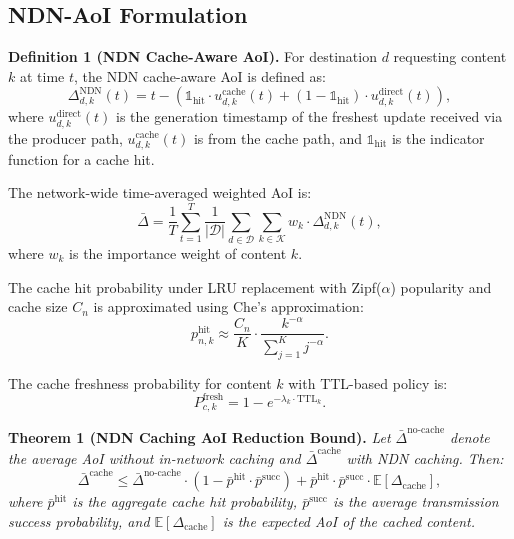 \documentclass[journal]{IEEEtran}
\begin{document}
\subsection{NDN-AoI Formulation} \label{subsec:ndn_aoi}

\textbf{Definition 1 (NDN Cache-Aware AoI).} For destination $d$ requesting content $k$ at time $t$, the NDN cache-aware AoI is defined as:
\begin{equation} \label{eq:aoi_ndn}
\Delta_{d,k}^{\text{NDN}}(t) = t - \left( \mathbb{1}_{\text{hit}} \cdot u_{d,k}^{\text{cache}}(t) + (1 - \mathbb{1}_{\text{hit}}) \cdot u_{d,k}^{\text{direct}}(t) \right),
\end{equation}
where $u_{d,k}^{\text{direct}}(t)$ is the generation timestamp of the freshest update received via the producer path, $u_{d,k}^{\text{cache}}(t)$ is from the cache path, and $\mathbb{1}_{\text{hit}}$ is the indicator function for a cache hit.

The network-wide time-averaged weighted AoI is:
\begin{equation} \label{eq:avg_aoi}
\bar{\Delta} = \frac{1}{T} \sum_{t=1}^{T} \frac{1}{|\mathcal{D}|} \sum_{d \in \mathcal{D}} \sum_{k \in \mathcal{K}} w_k \cdot \Delta_{d,k}^{\text{NDN}}(t),
\end{equation}
where $w_k$ is the importance weight of content $k$.

The cache hit probability under LRU replacement with Zipf($\alpha$) popularity and cache size $C_n$ is approximated using Che's approximation:
\begin{equation} \label{eq:cache_hit}
p_{n,k}^{\text{hit}} \approx \frac{C_n}{K} \cdot \frac{k^{-\alpha}}{\sum_{j=1}^{K} j^{-\alpha}}.
\end{equation}

The cache freshness probability for content $k$ with TTL-based policy is:
\begin{equation} \label{eq:freshness}
P_{c,k}^{\text{fresh}} = 1 - e^{-\lambda_k \cdot \text{TTL}_k}.
\end{equation}

\textbf{Theorem 1 (NDN Caching AoI Reduction Bound).} \emph{Let $\bar{\Delta}^{\text{no-cache}}$ denote the average AoI without in-network caching and $\bar{\Delta}^{\text{cache}}$ with NDN caching. Then:}
\begin{equation} \label{eq:theorem1}
\bar{\Delta}^{\text{cache}} \leq \bar{\Delta}^{\text{no-cache}} \cdot (1 - \bar{p}^{\text{hit}} \cdot \bar{p}^{\text{succ}}) + \bar{p}^{\text{hit}} \cdot \bar{p}^{\text{succ}} \cdot \mathbb{E}[\Delta_{\text{cache}}],
\end{equation}
\emph{where $\bar{p}^{\text{hit}}$ is the aggregate cache hit probability, $\bar{p}^{\text{succ}}$ is the average transmission success probability, and $\mathbb{E}[\Delta_{\text{cache}}]$ is the expected AoI of the cached content.}
\end{document}
